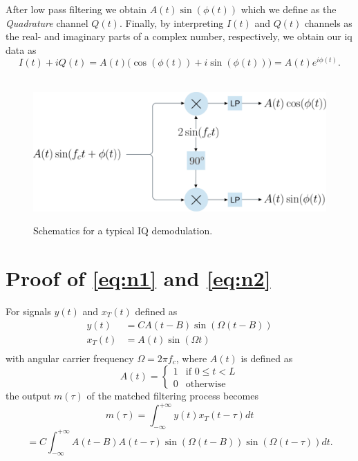 \begin{appendices}
After low pass filtering we obtain $A(t)\sin(\phi(t))$ which we define as the \emph{Quadrature} channel $Q(t)$. Finally, by interpreting $I(t)$ and $Q(t)$ channels as the real- and imaginary parts of a complex number, respectively, we obtain our \gls{iq} data as
\begin{equation}
	I(t)+iQ(t)=A(t)\Big(\cos(\phi(t))+i\sin(\phi(t))\Big)=A(t)e^{i\phi(t)}.
\end{equation}

\begin{figure}
	\centering
	\hbox{\hspace{-0.5em} \includegraphics[scale=0.60]{figs_temp/iq_demod.jpg}}
	\caption{Schematics for a typical IQ demodulation.}
	\label{fig:iq_demod}
\end{figure}

\chapter{Proof of \ref{eq:n1} and \ref{eq:n2}}\label{apx:conv}

For signals $y(t)$ and $x_T(t)$ defined as
\begin{equation}
	\begin{split}
		y(t) &= CA(t - B)\sin(\Omega(t - B)) \\
		x_T(t) &= A(t)\sin(\Omega t) \\
	\end{split}
\end{equation}
with angular carrier frequency $\Omega = 2\pi f_c$, where $A(t)$ is defined as 
\begin{equation}
	A(t) = \begin{cases}
		1 & \text{if $0 \leq t < L$} \\
		0 & \text{otherwise}
	\end{cases}
\end{equation}
the output $m(\tau)$ of the matched filtering process becomes
\begin{equation}
	m(\tau) 
	= \int_{-\infty}^{+\infty}y(t)x_T(t-\tau)dt
\end{equation}
\begin{equation}	
	= C \int_{-\infty}^{+\infty}A(t-B)A(t-\tau)\sin(\Omega(t-B))\sin(\Omega(t-\tau))dt.
\end{equation}


\end{appendices}
